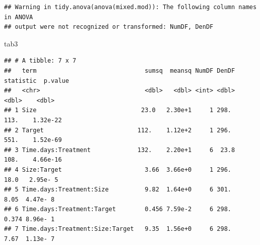 \documentclass[
]{article}
\newenvironment{Shaded}{\begin{snugshade}}{\end{snugshade}}
\newcommand{\AttributeTok}[1]{\textcolor[rgb]{0.13,0.29,0.53}{#1}}
\newcommand{\CommentTok}[1]{\textcolor[rgb]{0.56,0.35,0.01}{\textit{#1}}}
\newcommand{\ConstantTok}[1]{\textcolor[rgb]{0.56,0.35,0.01}{#1}}
\newcommand{\FunctionTok}[1]{\textcolor[rgb]{0.13,0.29,0.53}{\textbf{#1}}}
\newcommand{\NormalTok}[1]{#1}
\newcommand{\OtherTok}[1]{\textcolor[rgb]{0.56,0.35,0.01}{#1}}
\newcommand{\SpecialCharTok}[1]{\textcolor[rgb]{0.81,0.36,0.00}{\textbf{#1}}}
\begin{document}
\begin{Shaded}
\end{Shaded}

\begin{verbatim}
## Warning in tidy.anova(anova(mixed.mod)): The following column names in ANOVA
## output were not recognized or transformed: NumDF, DenDF
\end{verbatim}

\begin{Shaded}
\begin{Highlighting}[]
\NormalTok{tab3}
\end{Highlighting}
\end{Shaded}

\begin{verbatim}
## # A tibble: 7 x 7
##   term                              sumsq  meansq NumDF DenDF statistic  p.value
##   <chr>                             <dbl>   <dbl> <int> <dbl>     <dbl>    <dbl>
## 1 Size                             23.0   2.30e+1     1 298.    113.    1.32e-22
## 2 Target                          112.    1.12e+2     1 296.    551.    1.52e-69
## 3 Time.days:Treatment             132.    2.20e+1     6  23.8   108.    4.66e-16
## 4 Size:Target                       3.66  3.66e+0     1 296.     18.0   2.95e- 5
## 5 Time.days:Treatment:Size          9.82  1.64e+0     6 301.      8.05  4.47e- 8
## 6 Time.days:Treatment:Target        0.456 7.59e-2     6 298.      0.374 8.96e- 1
## 7 Time.days:Treatment:Size:Target   9.35  1.56e+0     6 298.      7.67  1.13e- 7
\end{verbatim}
\end{document}
